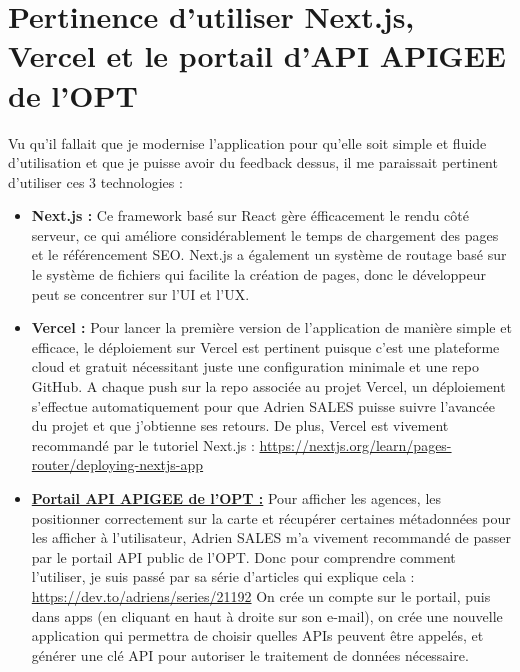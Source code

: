 \documentclass[12pt,a4paper]{report}
\begin{document}
\section{Pertinence d'utiliser Next.js, Vercel et le portail d'API APIGEE de l'OPT}
Vu qu'il fallait que je modernise l'application pour qu'elle soit simple et fluide d'utilisation et que je puisse avoir du feedback dessus, il me paraissait pertinent d'utiliser ces 3 technologies :
\vspace{1cm}
\begin{itemize}
    \item \textbf{Next.js :} Ce framework basé sur React gère éfficacement le rendu côté serveur, ce qui améliore considérablement le temps de chargement des pages et le référencement SEO. Next.js a également un système de routage basé sur le système de fichiers qui facilite la création de pages, donc le développeur peut se concentrer sur l'UI et l'UX.
    \vspace{1cm}
    \item \textbf{Vercel :} Pour lancer la première version de l'application de manière simple et efficace, le déploiement sur Vercel est pertinent puisque c'est une plateforme cloud et gratuit nécessitant juste une configuration minimale et une repo GitHub. A chaque push sur la repo associée au projet Vercel, un déploiement s'effectue automatiquement pour que Adrien SALES puisse suivre l'avancée du projet et que j'obtienne ses retours. De plus, Vercel est vivement recommandé par le tutoriel Next.js : \href{https://nextjs.org/learn/pages-router/deploying-nextjs-app}{https://nextjs.org/learn/pages-router/deploying-nextjs-app}
    \vspace{1cm}
    \item \textbf{\href{https://apigee-optnc-prd-api.apigee.io}{Portail API APIGEE de l'OPT :}} Pour afficher les agences, les positionner correctement sur la carte et récupérer certaines métadonnées pour les afficher à l'utilisateur, Adrien SALES m'a vivement recommandé de passer par le portail API public de l'OPT. Donc pour comprendre comment l'utiliser, je suis passé par sa série d'articles qui explique cela : \href{https://dev.to/adriens/series/21192}{https://dev.to/adriens/series/21192}
    On crée un compte sur le portail, puis dans apps (en cliquant en haut à droite sur son e-mail), on crée une nouvelle application qui permettra de choisir quelles APIs peuvent être appelés, et générer une clé API pour autoriser le traitement de données nécessaire.
\end{itemize}
\end{document}
